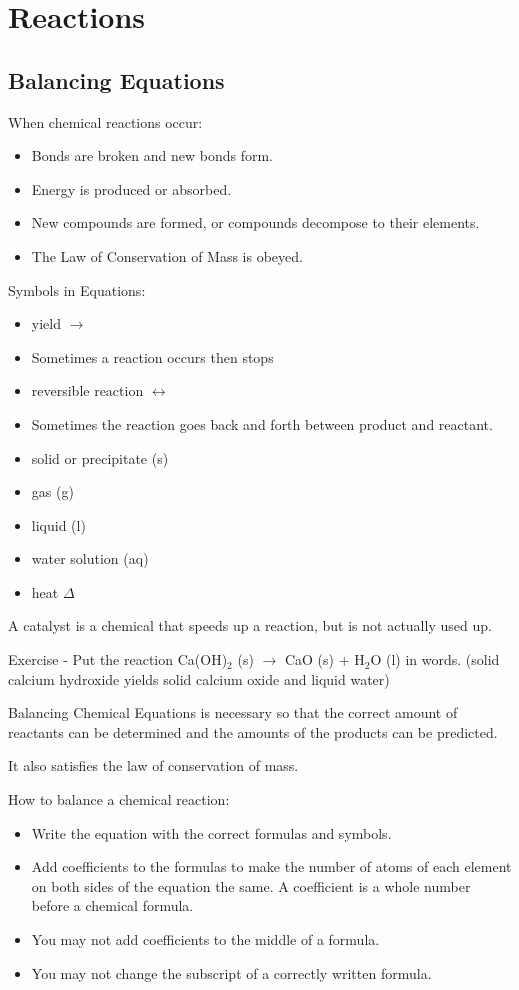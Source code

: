 \documentclass[../hchem.tex]{subfiles}
\begin{document}
\chapter{Reactions}
\section{Balancing Equations}
When chemical reactions occur:
\begin{itemize}
    \item Bonds are broken and new bonds form.
    \item Energy is produced or absorbed.
    \item New compounds are formed, or compounds decompose to their elements.
    \item The Law of Conservation of Mass is obeyed.
\end{itemize}

Symbols in Equations:
\begin{itemize}
    \item yield $\rightarrow$
    \item Sometimes a reaction occurs then stops 
    
    \item reversible reaction $\leftrightarrow$
    \item Sometimes the reaction goes back and forth between product and reactant.
    
    \item solid or precipitate (s)
    \item gas (g)
    \item liquid (l)
    \item water solution (aq)
    
    \item heat $\Delta$
\end{itemize}

A catalyst is a chemical that speeds up a reaction, but is not actually used up.

Exercise - Put the reaction Ca(OH)$_2$ (s) $\rightarrow$ CaO (s) + H$_2$O (l) in words. (solid calcium hydroxide yields solid calcium oxide and liquid water)

Balancing Chemical Equations is necessary so that the correct amount of reactants can be determined and the amounts of the products can be predicted.

It also satisfies the law of conservation of mass.

How to balance a chemical reaction:
\begin{itemize}
    \item Write the equation with the correct formulas and symbols.
    \item Add coefficients to the formulas to make the number of atoms of each element on both sides of the equation the same. A coefficient is a whole number before a chemical formula.
    \item You may not add coefficients to the middle of a formula.
    \item You may not change the subscript of a correctly written formula.
\end{itemize}
\end{document}
